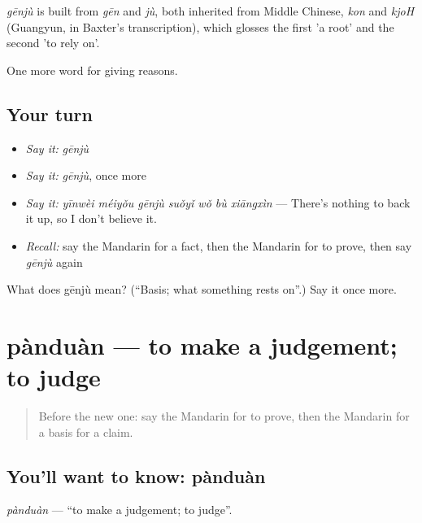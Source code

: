 \begin{cousinweb}
\emph{gēnjù} is built from \emph{gēn} and \emph{jù}, both inherited from Middle Chinese, \emph{kon} and \emph{kjoH} (Guangyun, in Baxter's transcription), which glosses the first 'a root' and the second 'to rely on'.
\end{cousinweb}

\begin{grammarlens}[title={What you've built}]
One more word for giving reasons.
\end{grammarlens}

\subsection*{Your turn}
\begin{itemize}
\raggedright
  \item \emph{Say it:} \emph{gēnjù}
  \item \emph{Say it:} \emph{gēnjù}, once more
  \item \emph{Say it:} \emph{yīnwèi méiyǒu gēnjù suǒyǐ wǒ bù xiāngxìn} — There's nothing to back it up, so I don't believe it.
  \item \emph{Recall:} say the Mandarin for a fact, then the Mandarin for to prove, then say \emph{gēnjù} again
\end{itemize}

\begin{tcolorbox}[breakable,colback=teal!4,colframe=teal!35!black,title={Before you move on}]
What does gēnjù mean? (\textquotedblleft{}Basis; what something rests on\textquotedblright{}.) Say it once more.
\end{tcolorbox}
\section[pànduàn]{pànduàn — to make a judgement; to judge}

\label{lesson:ZH-C350-panduan}



\begin{quote}
Before the new one: say the Mandarin for to prove, then the Mandarin for a basis for a claim.
\end{quote}

\subsection*{You'll want to know: pànduàn}
\emph{pànduàn} — \textquotedblleft{}to make a judgement; to judge\textquotedblright{}.

